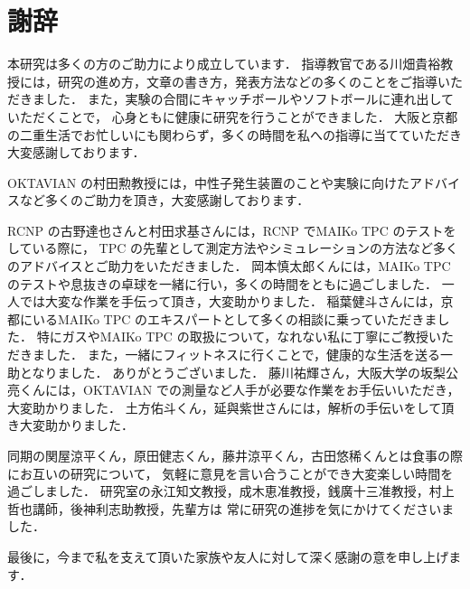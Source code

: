 \documentclass[../master]{subfiles}
\begin{document}
\chapter*{謝辞}
本研究は多くの方のご助力により成立しています．
指導教官である川畑貴裕教授には，研究の進め方，文章の書き方，発表方法などの多くのことをご指導いただきました．
また，実験の合間にキャッチボールやソフトボールに連れ出していただくことで，
心身ともに健康に研究を行うことができました．
大阪と京都の二重生活でお忙しいにも関わらず，多くの時間を私への指導に当てていただき大変感謝しております．

OKTAVIAN の村田勲教授には，中性子発生装置のことや実験に向けたアドバイスなど多くのご助力を頂き，大変感謝しております．

RCNP の古野達也さんと村田求基さんには，RCNP でMAIKo TPC のテストをしている際に，
TPC の先輩として測定方法やシミュレーションの方法など多くのアドバイスとご助力をいただきました．
岡本慎太郎くんには，MAIKo TPC のテストや息抜きの卓球を一緒に行い，多くの時間をともに過ごしました．
一人では大変な作業を手伝って頂き，大変助かりました．
稲葉健斗さんには，京都にいるMAIKo TPC のエキスパートとして多くの相談に乗っていただきました．
特にガスやMAIKo TPC の取扱について，なれない私に丁寧にご教授いただきました．
また，一緒にフィットネスに行くことで，健康的な生活を送る一助となりました．
ありがとうございました．
藤川祐輝さん，大阪大学の坂梨公亮くんには，OKTAVIAN での測量など人手が必要な作業をお手伝いいただき，大変助かりました．
土方佑斗くん，延與紫世さんには，解析の手伝いをして頂き大変助かりました．

同期の関屋涼平くん，原田健志くん，藤井涼平くん，古田悠稀くんとは食事の際にお互いの研究について，
気軽に意見を言い合うことができ大変楽しい時間を過ごしました．
研究室の永江知文教授，成木恵准教授，銭廣十三准教授，村上哲也講師，後神利志助教授，先輩方は
常に研究の進捗を気にかけてくださいました．

最後に，今まで私を支えて頂いた家族や友人に対して深く感謝の意を申し上げます．
\end{document}
